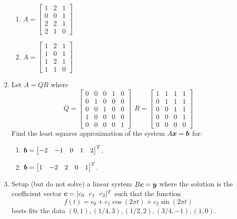 \begin{enumerate}[leftmargin=*]
\begin{enumerate}
\item $\displaystyle A = \begin{bmatrix} 1 & 2 & 1 \\ 0 & 0 & 1 \\ 2 & 2 & 1 \\ 2 & 1 & 0 \end{bmatrix}$
\item $\displaystyle A = \begin{bmatrix} 1 & 2 & 1 \\ 1 & 0 & 1 \\ 1 & 2 & 1 \\ 1 & 1 & 0 \end{bmatrix}$
\end{enumerate}
\item Let $A = QR$ where
$$
Q = \left[ \begin{array}{rrrrr} 0 & 0 & 0 & 1 & 0 \\ 0 & 1 & 0 & 0 & 0 \\ 0 & 0 & 1 & 0 & 0 \\ 1 & 0 & 0 & 0 & 0 \\ 0 & 0 & 0 & 0 & 1 \end{array} \right]
\ \
R = \left[ \begin{array}{rrrr} 1 & 1 & 1 & 1 \\ 0 & 1 & 1 & 1 \\ 0 & 0 & 1 & 1 \\ 0 & 0 & 0 & 1 \\ 0 & 0 & 0 & 0 \end{array} \right]
$$
Find the least squares approximation of the system $A\boldsymbol{x} = \boldsymbol{b}$ for:
\begin{enumerate}
\item $\boldsymbol{b} = \begin{bmatrix} -2 & -1 & 0 & 1 & 2 \end{bmatrix}^T$.
\item $\boldsymbol{b} = \begin{bmatrix} 1 & -2 & 2 & 0 & 1 \end{bmatrix}^T$.
\end{enumerate}
\item Setup (but do not solve) a linear system $B \boldsymbol{c} = \boldsymbol{y}$ where the solution is the coefficient vector $\bs{c} = [c_0 \ \ c_1 \ \ c_2]^T$ such that the function
$$
f(t) = c_0  + c_1\cos(2 \pi t) + c_2 \sin(2 \pi t)
$$
bests fits the data $(0,1),(1/4,3),(1/2,2),(3/4,-1),(1,0)$.
\end{enumerate}